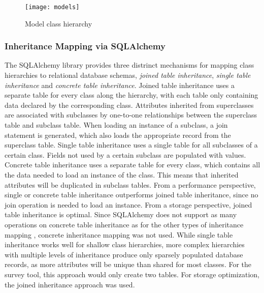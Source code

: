         \begin{figure}
            \centering
            \texttt{[image: models]}
            \caption{Model class hierarchy}
            \label{fig:model-dia}
        \end{figure}

    \subsubsection{Inheritance Mapping via SQLAlchemy}
    \label{section:implementation:inheritance-mapping}
        The SQLAlchemy library provides three distrinct mechanisms
        for mapping class hierarchies to relational database schemas,
        \textit{joined table inheritance}, \textit{single table inheritance}
        and \textit{concrete table inheritance}.
        Joined table inheritance uses a separate table for every
        class along the hierarchy, with each table only
        containing data declared by the corresponding class.
        Attributes inherited from superclasses are associated
        with subclasses by one-to-one relationships between the
        superclass table and subclass table. When loading
        an instance of a subclass, a join statement is generated,
        which also loads the appropriate record from the superclass
        table. Single table inheritance uses a single table
        for all subclasses of a certain class. Fields
        not used by a certain subclass are populated with 
        values. Concrete table inheritance uses a separate table for
        every class, which contains all the data needed to load an
        instance of the class. This means that inherited attributes
        will be duplicated in subclass tables.
        From a performance perspective, single or concrete table
        inheritance outperforms joined table inheritance, since
        no join operation is needed to load an instance.
        From a storage perspective, joined table inheritance is
        optimal. Since SQLAlchemy does not support as many
        operations on concrete table inheritance as for the
        other types of inheritance mapping \cite{sqla-inheritance}, concrete inheritance
        mapping was not used. While single table inheritance
        works well for shallow class hierarchies, more
        complex hierarchies with multiple levels of inheritance
        produce only sparsely populated database records, as more attributes
        will be unique than shared for most classes.
        For the survey tool, this approach would only create
        two tables. For storage optimization, the joined
        inheritance approach was used.

